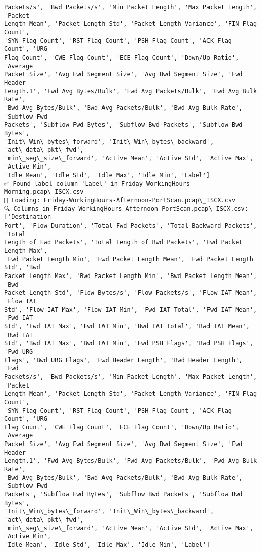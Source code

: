 \documentclass[11pt]{article}
\begin{document}
\begin{Verbatim}[commandchars=\\\{\}]
Packets/s', 'Bwd Packets/s', 'Min Packet Length', 'Max Packet Length', 'Packet
Length Mean', 'Packet Length Std', 'Packet Length Variance', 'FIN Flag Count',
'SYN Flag Count', 'RST Flag Count', 'PSH Flag Count', 'ACK Flag Count', 'URG
Flag Count', 'CWE Flag Count', 'ECE Flag Count', 'Down/Up Ratio', 'Average
Packet Size', 'Avg Fwd Segment Size', 'Avg Bwd Segment Size', 'Fwd Header
Length.1', 'Fwd Avg Bytes/Bulk', 'Fwd Avg Packets/Bulk', 'Fwd Avg Bulk Rate',
'Bwd Avg Bytes/Bulk', 'Bwd Avg Packets/Bulk', 'Bwd Avg Bulk Rate', 'Subflow Fwd
Packets', 'Subflow Fwd Bytes', 'Subflow Bwd Packets', 'Subflow Bwd Bytes',
'Init\_Win\_bytes\_forward', 'Init\_Win\_bytes\_backward', 'act\_data\_pkt\_fwd',
'min\_seg\_size\_forward', 'Active Mean', 'Active Std', 'Active Max', 'Active Min',
'Idle Mean', 'Idle Std', 'Idle Max', 'Idle Min', 'Label']
✅ Found label column 'Label' in Friday-WorkingHours-Morning.pcap\_ISCX.csv
📅 Loading: Friday-WorkingHours-Afternoon-PortScan.pcap\_ISCX.csv
🔍 Columns in Friday-WorkingHours-Afternoon-PortScan.pcap\_ISCX.csv: ['Destination
Port', 'Flow Duration', 'Total Fwd Packets', 'Total Backward Packets', 'Total
Length of Fwd Packets', 'Total Length of Bwd Packets', 'Fwd Packet Length Max',
'Fwd Packet Length Min', 'Fwd Packet Length Mean', 'Fwd Packet Length Std', 'Bwd
Packet Length Max', 'Bwd Packet Length Min', 'Bwd Packet Length Mean', 'Bwd
Packet Length Std', 'Flow Bytes/s', 'Flow Packets/s', 'Flow IAT Mean', 'Flow IAT
Std', 'Flow IAT Max', 'Flow IAT Min', 'Fwd IAT Total', 'Fwd IAT Mean', 'Fwd IAT
Std', 'Fwd IAT Max', 'Fwd IAT Min', 'Bwd IAT Total', 'Bwd IAT Mean', 'Bwd IAT
Std', 'Bwd IAT Max', 'Bwd IAT Min', 'Fwd PSH Flags', 'Bwd PSH Flags', 'Fwd URG
Flags', 'Bwd URG Flags', 'Fwd Header Length', 'Bwd Header Length', 'Fwd
Packets/s', 'Bwd Packets/s', 'Min Packet Length', 'Max Packet Length', 'Packet
Length Mean', 'Packet Length Std', 'Packet Length Variance', 'FIN Flag Count',
'SYN Flag Count', 'RST Flag Count', 'PSH Flag Count', 'ACK Flag Count', 'URG
Flag Count', 'CWE Flag Count', 'ECE Flag Count', 'Down/Up Ratio', 'Average
Packet Size', 'Avg Fwd Segment Size', 'Avg Bwd Segment Size', 'Fwd Header
Length.1', 'Fwd Avg Bytes/Bulk', 'Fwd Avg Packets/Bulk', 'Fwd Avg Bulk Rate',
'Bwd Avg Bytes/Bulk', 'Bwd Avg Packets/Bulk', 'Bwd Avg Bulk Rate', 'Subflow Fwd
Packets', 'Subflow Fwd Bytes', 'Subflow Bwd Packets', 'Subflow Bwd Bytes',
'Init\_Win\_bytes\_forward', 'Init\_Win\_bytes\_backward', 'act\_data\_pkt\_fwd',
'min\_seg\_size\_forward', 'Active Mean', 'Active Std', 'Active Max', 'Active Min',
'Idle Mean', 'Idle Std', 'Idle Max', 'Idle Min', 'Label']

\end{Verbatim}
\end{document}
